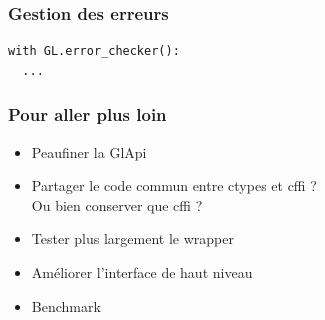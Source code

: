 \begin{frame}[fragile]
  \frametitle{Gestion des erreurs}
\begin{verbatim}
with GL.error_checker():
  ...
\end{verbatim}
  \note{
    \begin{enumerate}
    \item 
    \end{enumerate}
  }
\end{frame}

\begin{frame}
  \frametitle{Pour aller plus loin}
  \begin{itemize}
  \item Peaufiner la GlApi
  \item Partager le code commun entre ctypes et cffi ? \\
    Ou bien conserver que cffi ?
  \item Tester plus largement le wrapper
  \item Améliorer l'interface de haut niveau
  \item Benchmark
  \end{itemize}
  \note{
    \begin{enumerate}
    \item 
    \end{enumerate}
  }
\end{frame}

